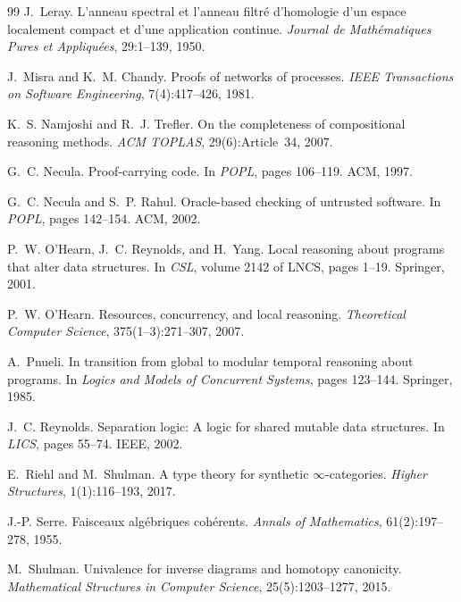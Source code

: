 \documentclass[11pt]{article}
\begin{document}
\begin{thebibliography}{99}
J.~Leray.
\newblock L'anneau spectral et l'anneau filtr\'{e} d'homologie d'un espace
  localement compact et d'une application continue.
\newblock \emph{Journal de Math\'{e}matiques Pures et Appliqu\'{e}es},
  29:1--139, 1950.

J.~Misra and K.~M. Chandy.
\newblock Proofs of networks of processes.
\newblock \emph{IEEE Transactions on Software Engineering}, 7(4):417--426,
  1981.

K.~S. Namjoshi and R.~J. Trefler.
\newblock On the completeness of compositional reasoning methods.
\newblock \emph{ACM TOPLAS}, 29(6):Article~34, 2007.

G.~C. Necula.
\newblock Proof-carrying code.
\newblock In \emph{POPL}, pages 106--119. ACM, 1997.

G.~C. Necula and S.~P. Rahul.
\newblock Oracle-based checking of untrusted software.
\newblock In \emph{POPL}, pages 142--154. ACM, 2002.

P.~W. O'Hearn, J.~C. Reynolds, and H.~Yang.
\newblock Local reasoning about programs that alter data structures.
\newblock In \emph{CSL}, volume 2142 of LNCS, pages 1--19. Springer, 2001.

P.~W. O'Hearn.
\newblock Resources, concurrency, and local reasoning.
\newblock \emph{Theoretical Computer Science}, 375(1--3):271--307, 2007.

A.~Pnueli.
\newblock In transition from global to modular temporal reasoning about
  programs.
\newblock In \emph{Logics and Models of Concurrent Systems}, pages 123--144.
  Springer, 1985.

J.~C. Reynolds.
\newblock Separation logic: A logic for shared mutable data structures.
\newblock In \emph{LICS}, pages 55--74. IEEE, 2002.

E.~Riehl and M.~Shulman.
\newblock A type theory for synthetic $\infty$-categories.
\newblock \emph{Higher Structures}, 1(1):116--193, 2017.

J.-P. Serre.
\newblock Faisceaux alg\'{e}briques coh\'{e}rents.
\newblock \emph{Annals of Mathematics}, 61(2):197--278, 1955.

M.~Shulman.
\newblock Univalence for inverse diagrams and homotopy canonicity.
\newblock \emph{Mathematical Structures in Computer Science},
  25(5):1203--1277, 2015.


\end{thebibliography}
\end{document}
